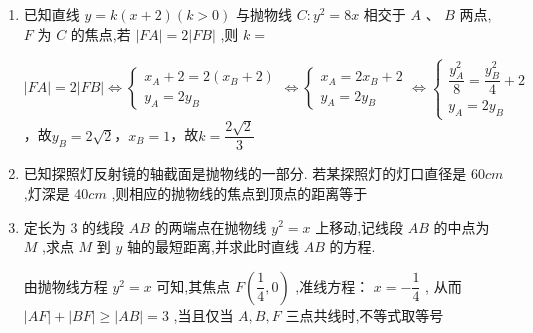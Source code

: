 \begin{enumerate}
\begin{jieda}
        联立直线和抛物线，消去$y$可得$ax^2 = kx+b$，即$ax^2 - kx - b = 0$，根据韦达定理有$\left\{\begin{array}{l}
             x_1+x_2 = \dfrac{k}{a} \\
             x_1x_2 = -\dfrac{b}{a}
        \end{array}\right.$，故${x}_{1}{x}_{2} = {x}_{2}{x}_{3} + {x}_{1}{x}_{3}$即$-\dfrac{b}{a} = \dfrac{k}{a} \times \left(-\dfrac{b}{k}\right)$，成立.
    \end{jieda}

    \item 已知直线 $y = k\left( {x + 2}\right) \left( {k > 0}\right)$ 与抛物线 $C : {y}^{2} = {8x}$ 相交于 $A\text{ 、 }B$ 两点, $F$ 为 $C$ 的焦点,若 $\left| {FA}\right|  = 2\left| {FB}\right|$ ,则 $k =$
    \begin{jieda}
        $\left| {FA}\right|  = 2\left| {FB}\right| \Longleftrightarrow \left\{\begin{array}{l}
             x_A + 2 = 2(x_B+2) \\
             y_A = 2y_B
        \end{array}\right. \Longleftrightarrow \left\{\begin{array}{l}
             x_A = 2x_B + 2 \\
             y_A = 2y_B
        \end{array}\right. \Longleftrightarrow \left\{\begin{array}{l}
             \dfrac{y_A^2}{8} = \dfrac{y_B^2}{4} + 2 \\
             y_A = 2y_B
        \end{array}\right.$，故$y_B = 2\sqrt{2}$，$x_B = 1$，故$k = \dfrac{2\sqrt{2}}{3}$
    \end{jieda}


    \item 已知探照灯反射镜的轴截面是抛物线的一部分. 若某探照灯的灯口直径是 ${60}{{cm}}$ ,灯深是 ${40}{{cm}}$ ,则相应的抛物线的焦点到顶点的距离等于

    \item 定长为 3 的线段 ${AB}$ 的两端点在抛物线 ${y}^{2} = x$ 上移动,记线段 ${AB}$ 的中点为 $M$ ,求点 $M$ 到 $y$ 轴的最短距离,并求此时直线 ${AB}$ 的方程.
    \begin{jieda}
        由抛物线方程 $y^2 = x$ 可知,其焦点 $F\left( {\dfrac{1}{4},0}\right)$ ,准线方程： $x =  - \dfrac{1}{4}$ ,
        从而 $\left| {AF}\right|  + \left| {BF}\right|  \geq  \left| {AB}\right|  = 3$ ,当且仅当 $A,B,F$ 三点共线时,不等式取等号
        

\end{jieda}
\end{enumerate}

